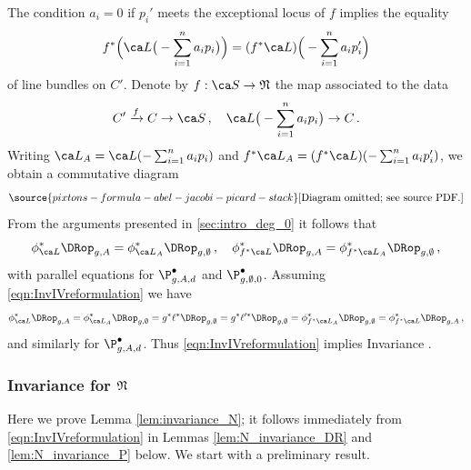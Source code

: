 The condition $a_i=0$ if $p_i'$ meets the exceptional locus of $f$ implies the equality
\[f^*\Big(\ca L\big(-\sum_{i=1}^n a_i p_i\big) \Big) = (f^* \ca L)\Big(-\sum_{i=1}^n a_i p_i'\Big)\]
of line bundles on $C'$. Denote by $f:\ca S \to \frak N$ the map associated to the data
\[C' \xrightarrow{f} C \to \ca S\, ,\ \ \ \ca L\big(-\sum_{i=1}^n a_i p_i \big) \to C\, .\]
Writing $\ca L_A = \ca L(-\sum_{i=1}^n a_i p_i)$ and $f^*\ca L_A = (f^*\ca L)(-\sum_{i=1}^n a_i p_i')$,
 we obtain a commutative diagram
\begin{equation} \label{eqn:frakNdiagram}
\source{pixtons-formula-abel-jacobi-picard-stack}
\text{[Diagram omitted; see source PDF.]}
\end{equation}
From the arguments presented in \cref{sec:intro_deg_0} it follows that
\[\phi_{\ca L}^* \DRop_{g,A} = \phi_{\ca L_A}^* \DRop_{g,\emptyset}\, ,\ \ \  \phi_{f^*\ca L}^* \DRop_{g,A} = \phi_{f^*\ca L_A}^* \DRop_{g,\emptyset}\, ,\]
with parallel equations for $\P^\bullet_{g,A,d}$ and $\P^\bullet_{g,\emptyset,0}$.
Assuming \eqref{eqn:InvIVreformulation} we have
\begin{equation*}
    \phi_{\ca L}^* \DRop_{g,A} = \phi_{\ca L_A}^* \DRop_{g,\emptyset} = g^* \targetmap^* \DRop_{g,\emptyset}
    = g^* \sourcemap^* \DRop_{g,\emptyset} = \phi_{f^*\ca L_A}^* \DRop_{g,\emptyset} = \phi_{f^*\ca L}^* \DRop_{g,A}\, ,
\end{equation*}
and similarly for $\P^\bullet_{g,A,d}$. Thus \eqref{eqn:InvIVreformulation} implies Invariance \invnrIV.

\subsubsection{Invariance for $\frak N$}
Here we prove Lemma \ref{lem:invariance_N}; it follows immediately from \eqref{eqn:InvIVreformulation} in Lemmas \ref{lem:N_invariance_DR} and \ref{lem:N_invariance_P} below. We start with a preliminary result.

